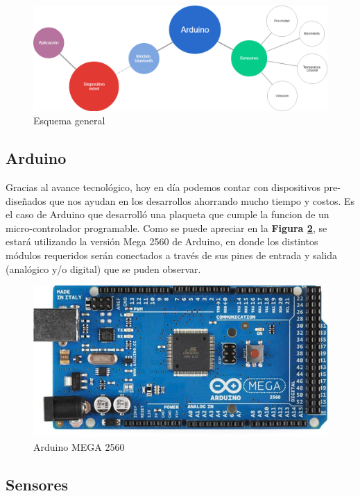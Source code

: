 \documentclass{IEEEtran}
\begin{document}
			\begin{figure}
				\centering
				\includegraphics[width=1\linewidth]{esquemageneral}
				\caption{Esquema general}
				\label{esquemageneral}
			\end{figure}

		\subsection{Arduino}

			Gracias al avance tecnológico, hoy en día podemos contar con dispositivos pre-diseñados que nos ayudan en los desarrollos ahorrando mucho tiempo y costos. Es el caso de Arduino \cite{arduinourl} que desarrolló una plaqueta que cumple la funcion de un micro-controlador programable.
			Como se puede apreciar en la \textbf{Figura \ref{arduino-mega}}, se estará utilizando la versión Mega 2560 de Arduino, en donde los distintos módulos requeridos serán conectados a través de sus pines de entrada y salida (analógico y/o digital) que se puden observar.

			\begin{figure}
				\centering
				\includegraphics[width=0.8\linewidth]{arduino-mega}
				\caption{Arduino MEGA 2560}
				\label{arduino-mega}
			\end{figure}

		\subsection{Sensores}
\end{document}
